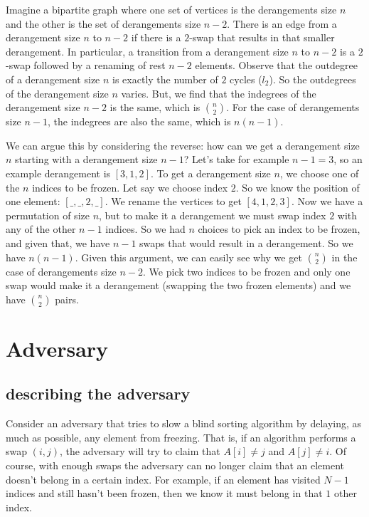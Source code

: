 \documentclass{article}
\begin{document}
Imagine a bipartite graph where one set of vertices is the derangements size $n$ and the
other is the set of derangements size $n - 2$. There is an edge from a derangement size
$n$ to $n - 2$ if there is a $2$-swap that results in that smaller derangement. 
In particular, a transition from a derangement size $n$ to $n - 2$ is a $2$-swap followed
by a renaming of rest $n - 2$ elements.
Observe that the outdegree of a derangement size $n$ is exactly the number of $2$ cycles ($l_2$).
So the outdegrees of the derangement size $n$ varies. But, we find that the indegrees of the
derangement size $n - 2$ is the same, which is ${n \choose 2}$. For the case
of derangements size $n - 1$, the indegrees are also the same, which is $n(n-1)$.

We can argue this by considering the reverse: how can we get a derangement size $n$ starting
with a derangement size $n - 1$? Let's take for example $n - 1 = 3$, so an example
derangement is $[3, 1, 2]$. To get a derangement size $n$, we choose one of the $n$ 
indices to be frozen. Let say we choose index $2$. So we know the position of one element:
$[\_, \_, 2, \_]$. We rename the vertices to get $[4, 1, 2, 3]$. Now we have a permutation
of size $n$, but to make it a derangement we must swap index $2$ with any of the other $n - 1$ indices.
So we had $n$ choices to pick an index to be frozen, and given that, we have $n - 1$ swaps that would
result in a derangement. So we have $n(n - 1)$. Given this argument, we can easily see why 
we get ${n \choose 2}$ in the case of derangements size $n - 2$. We pick two indices to be frozen
and only one swap would make it a derangement (swapping the two frozen elements) and we have ${n \choose 2}$ pairs.

\section{Adversary}
\subsection{describing the adversary}
Consider an adversary that tries to slow a blind sorting algorithm by delaying, as much as possible, any
element from freezing.
That is, if an algorithm performs a swap $(i, j)$, the adversary will try to claim that $A[i] \neq j$ and
$A[j] \neq i$. Of course, with enough swaps the adversary can no longer claim that an element doesn't
belong in a certain index. For example, if an element has visited $N - 1$ indices and still hasn't been frozen,
then we know it must belong in that $1$ other index.
\end{document}
